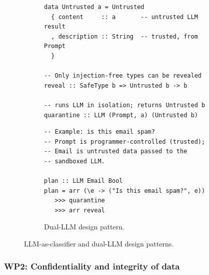 \documentclass{kaw}
\begin{document}
\begin{figure}[t]
\begin{subfigure}{\linewidth}
{}%
\par\smallskip
\begin{minipage}[t]{0.47\linewidth}
\begin{verbatim}
data Untrusted a = Untrusted
  { content     :: a       -- untrusted LLM result
  , description :: String  -- trusted, from Prompt
  }

-- Only injection-free types can be revealed
reveal :: SafeType b => Untrusted b -> b

-- runs LLM in isolation; returns Untrusted b
quarantine :: LLM (Prompt, a) (Untrusted b)
\end{verbatim}
\end{minipage}%
\hfill
\begin{minipage}[t]{0.47\linewidth}
\begin{verbatim}
-- Example: is this email spam?
-- Prompt is programmer-controlled (trusted);
-- Email is untrusted data passed to the
-- sandboxed LLM.

plan :: LLM Email Bool
plan = arr (\e -> ("Is this email spam?", e))
   >>> quarantine
   >>> arr reveal
\end{verbatim}
\end{minipage}
\caption{Dual-LLM design pattern.\label{fig:dual}}
\end{subfigure}

\caption{LLM-as-classifier and dual-LLM design patterns.\label{fig:patterns}}
\end{figure}

\subsubsection{WP2: Confidentiality and integrity of data}
%
\end{document}
